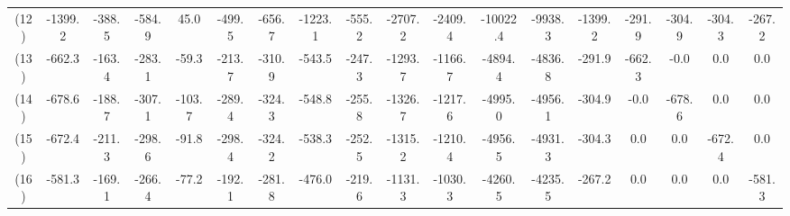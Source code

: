 \begin{tabular}{cccccccccccccccccc}
(12) & -1399.2 & -388.5 & -584.9 & 45.0 & -499.5 & -656.7 & -1223.1 & -555.2 & -2707.2 & -2409.4 & -10022.4 & -9938.3 & -1399.2 & -291.9 & -304.9 & -304.3 & -267.2 \\
(13) & -662.3 & -163.4 & -283.1 & -59.3 & -213.7 & -310.9 & -543.5 & -247.3 & -1293.7 & -1166.7 & -4894.4 & -4836.8 & -291.9 & -662.3 & -0.0 & 0.0 & 0.0 \\
(14) & -678.6 & -188.7 & -307.1 & -103.7 & -289.4 & -324.3 & -548.8 & -255.8 & -1326.7 & -1217.6 & -4995.0 & -4956.1 & -304.9 & -0.0 & -678.6 & 0.0 & 0.0 \\
(15) & -672.4 & -211.3 & -298.6 & -91.8 & -298.4 & -324.2 & -538.3 & -252.5 & -1315.2 & -1210.4 & -4956.5 & -4931.3 & -304.3 & 0.0 & 0.0 & -672.4 & 0.0 \\
(16) & -581.3 & -169.1 & -266.4 & -77.2 & -192.1 & -281.8 & -476.0 & -219.6 & -1131.3 & -1030.3 & -4260.5 & -4235.5 & -267.2 & 0.0 & 0.0 & 0.0 & -581.3 \\
\end{tabular}

